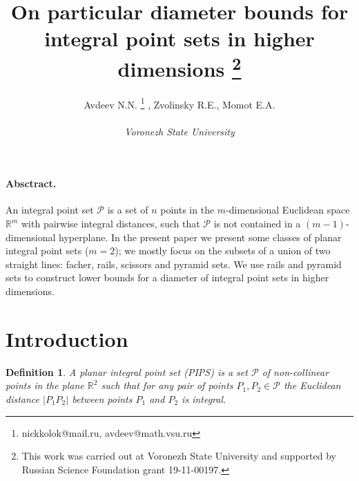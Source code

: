 \documentclass[12pt]{article}
\theoremstyle{theorem}
\theoremstyle{dfn}
\newtheorem{dfn}{Definition}
\theoremstyle{remark}
\begin{document}






\title{
	On particular diameter bounds for integral point sets in higher dimensions
	\footnote{
		This work was carried out at Voronezh State University and supported by Russian Science
		Foundation grant 19-11-00197.
	}
}

\author{
	Avdeev N.N.
	\footnote{nickkolok@mail.ru, avdeev@math.vsu.ru}
	, Zvolinsky R.E., Momot E.A.
	\\
	\\
	\emph{Voronezh State University}
}

\maketitle


\paragraph{Absctract.}
	An integral point set $\mathcal{P}$ is a set of $n$ points in
	the $m$-dimensional Euclidean space $\mathbb{R}^{m}$ with pairwise
	integral distances,
	such that $\mathcal{P}$ is not contained in a $(m-1)$-dimensional hyperplane.
	In the present paper we present some classes of planar integral point sets ($m=2$);
	we mostly focus on the subsets of a union of two straight lines:
	facher, rails, scissors and pyramid sets.
	We use rails and pyramid sets to construct lower bounds for a diameter
	of integral point sets in higher dimensions.

\section{Introduction}



\begin{dfn}\label{dfn1}
	A planar integral point set (PIPS) is a set $\mathcal{P}$
	of non-collinear points in the plane $\mathbb{R}^{2}$ such that
	for any pair of points $P_{1}, P_{2} \in \mathcal{P}$
	the Euclidean distance $|P_{1}P_{2}|$
	between points $P_{1}$ and $P_{2}$ is integral.
\end{dfn}
\end{document}
